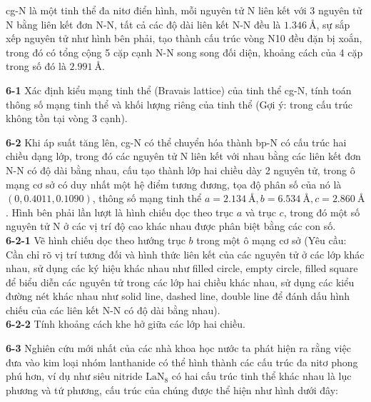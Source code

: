 \begin{figure}
\end{figure}
cg-N là một tinh thể đa nitơ điển hình, mỗi nguyên tử N liên kết với 3 nguyên tử N bằng liên kết đơn N-N, tất cả các độ dài liên kết N-N đều là $1.346\ \text{\AA}$, sự sắp xếp nguyên tử như hình bên phải, tạo thành cấu trúc vòng N10 đều đặn bị xoắn, trong đó có tổng cộng 5 cặp cạnh N-N song song đối diện, khoảng cách của 4 cặp trong số đó là $2.991\ \text{\AA}$.

\vspace{0.2cm}

\noindent
\textbf{6-1} Xác định kiểu mạng tinh thể (Bravais lattice) của tinh thể cg-N, tính toán thông số mạng tinh thể và khối lượng riêng của tinh thể (Gợi ý: trong cấu trúc không tồn tại vòng 3 cạnh).

\begin{figure}
\end{figure}
\noindent
\textbf{6-2} Khi áp suất tăng lên, cg-N có thể chuyển hóa thành bp-N có cấu trúc hai chiều dạng lớp, trong đó các nguyên tử N liên kết với nhau bằng các liên kết đơn N-N có độ dài bằng nhau, cấu tạo thành lớp hai chiều dày 2 nguyên tử, trong ô mạng cơ sở có duy nhất một hệ điểm tương đương, tọa độ phân số của nó là $(0, 0.4011, 0.1090)$, thông số mạng tinh thể $a = 2.134\ \text{\AA}, b = 6.534\ \text{\AA}, c = 2.860\ \text{\AA}$. Hình bên phải lần lượt là hình chiếu dọc theo trục $a$ và trục $c$, trong đó một số nguyên tử N ở các vị trí độ cao khác nhau được phân biệt bằng các con số. \\
\textbf{6-2-1} Vẽ hình chiếu dọc theo hướng trục $b$ trong một ô mạng cơ sở (Yêu cầu: Cần chỉ rõ vị trí tương đối và hình thức liên kết của các nguyên tử ở các lớp khác nhau, sử dụng các ký hiệu khác nhau như filled circle, empty circle, filled square để biểu diễn các nguyên tử trong các lớp hai chiều khác nhau, sử dụng các kiểu đường nét khác nhau như solid line, dashed line, double line để đánh dấu hình chiếu của các liên kết N-N có độ dài bằng nhau). \\
\textbf{6-2-2} Tính khoảng cách khe hở giữa các lớp hai chiều.

\vspace{0.2cm}

\noindent
\textbf{6-3} Nghiên cứu mới nhất của các nhà khoa học nước ta phát hiện ra rằng việc đưa vào kim loại nhóm lanthanide có thể hình thành các cấu trúc đa nitơ phong phú hơn, ví dụ như siêu nitride $\mathrm{LaN_8}$ có hai cấu trúc tinh thể khác nhau là lục phương và tứ phương, cấu trúc của chúng được thể hiện như hình dưới đây:


